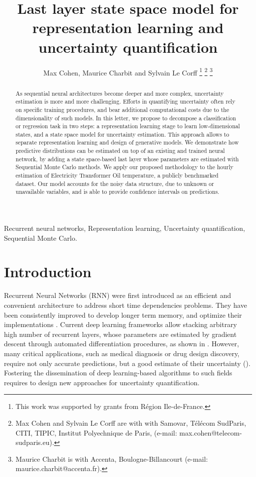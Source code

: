 \documentclass[journal]{IEEEtran}
\title{Last layer state space model for representation learning and uncertainty quantification}
\author{Max Cohen, Maurice Charbit and Sylvain Le Corff
	\thanks{This work was supported by grants from Région Ile-de-France.}
	\thanks{Max Cohen and Sylvain Le Corff are with with Samovar, T\'el\'ecom SudParis, CITI, TIPIC, Institut Polyechnique de Paris, (e-mail: max.cohen@telecom-sudparis.eu).}
	\thanks{Maurice Charbit is with Accenta, Boulogne-Billancourt (e-mail: maurice.charbit@accenta.fr).}}
\begin{document}
\maketitle
\begin{abstract}
	As sequential neural architectures become deeper and more complex, uncertainty estimation is more and more challenging.
	Efforts in quantifying uncertainty often rely on specific training procedures, and bear additional computational costs due to the dimensionality of such models.
	In this letter, we propose to decompose a classification or regression task in two steps: a representation learning stage to learn low-dimensional states, and a state space model for uncertainty estimation.
	This approach allows to separate representation learning and design of generative models.
	We demonstrate how predictive distributions can be estimated on top of an existing and trained neural network, by adding a state space-based last layer whose parameters are estimated with Sequential Monte Carlo methods.
	We apply our proposed methodology to the hourly estimation of Electricity Transformer Oil temperature, a publicly benchmarked dataset.
	Our model accounts for the noisy data structure, due to unknown or unavailable variables, and is able to provide confidence intervals on predictions.
\end{abstract}

\begin{IEEEkeywords}
	Recurrent neural networks, Representation learning, Uncertainty quantification, Sequential Monte Carlo.
\end{IEEEkeywords}

\section{Introduction}
\label{sec:intro}

Recurrent Neural Networks (RNN) were first introduced as an efficient and convenient architecture to address short time dependencies problems.
They have been consistently improved to develop longer term memory, and optimize their implementations \cite{Bengio1994LearningLD,Hochreiter1997LongSM}. %
Current deep learning frameworks allow stacking arbitrary high number of recurrent layers, whose parameters are estimated by gradient descent through automated differentiation procedures, as shown in \cite{Graves2013SpeechRecognition}.
However, many critical applications, such as medical diagnosis or drug design discovery, require not only accurate predictions, but a good estimate of their uncertainty (\cite{Crowson2016AssessingCalibration, Mervin2020UncertaintyQuantification}).
Fostering the dissemination of deep learning-based algorithms to such fields requires to design new approaches for uncertainty quantification.
\end{document}

